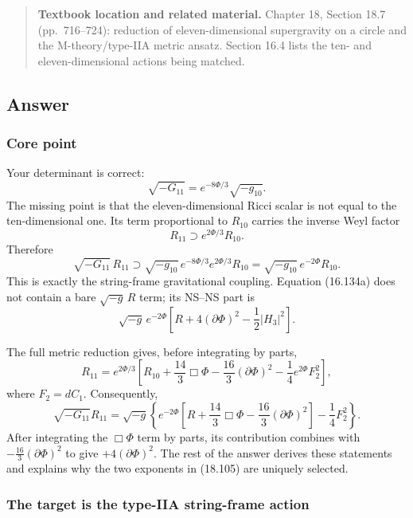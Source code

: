 \documentclass[
  10pt,
  a4paper,
  openany]{book}
\begin{document}
\begin{quote}
\textbf{Textbook location and related material.} Chapter 18, Section
18.7 (pp.~716--724): reduction of eleven-dimensional supergravity on a
circle and the M-theory/type-IIA metric ansatz. Section 16.4 lists the
ten- and eleven-dimensional actions being matched.
\end{quote}

\subsection{Answer}\label{answer-40}

\subsubsection{Core point}\label{core-point-40}

Your determinant is correct: \[
\boxed{
\sqrt{-G_{11}}
=e^{-8\Phi/3}\sqrt{-g_{10}}
}.
\] The missing point is that the eleven-dimensional Ricci scalar is not
equal to the ten-dimensional one. Its term proportional to \(R_{10}\)
carries the inverse Weyl factor \[
R_{11}
\supset
e^{2\Phi/3}R_{10}.
\] Therefore \[
\sqrt{-G_{11}}\,R_{11}
\supset
\sqrt{-g_{10}}\,
e^{-8\Phi/3}e^{2\Phi/3}R_{10}
=
\sqrt{-g_{10}}\,e^{-2\Phi}R_{10}.
\] This is exactly the string-frame gravitational coupling. Equation
(16.134a) does not contain a bare \(\sqrt{-g}\,R\) term; its NS--NS part
is \[
\boxed{
\sqrt{-g}\,e^{-2\Phi}
\left[
R+4(\partial\Phi)^2-\frac12|H_3|^2
\right]
}.
\]

The full metric reduction gives, before integrating by parts, \[
\boxed{
R_{11}
=e^{2\Phi/3}
\left[
R_{10}
+\frac{14}{3}\Box\Phi
-\frac{16}{3}(\partial\Phi)^2
-\frac14e^{2\Phi}F_2^2
\right]
},
\] where \(F_2=dC_1\). Consequently, \[
\boxed{
\sqrt{-G_{11}}R_{11}
=\sqrt{-g}
\left\{
e^{-2\Phi}
\left[
R+\frac{14}{3}\Box\Phi-\frac{16}{3}(\partial\Phi)^2
\right]
-\frac14F_2^2
\right\}.
}
\] After integrating the \(\Box\Phi\) term by parts, its contribution
combines with \(-\frac{16}{3}(\partial\Phi)^2\) to give
\(+4(\partial\Phi)^2\). The rest of the answer derives these statements
and explains why the two exponents in (18.105) are uniquely selected.

\subsubsection{The target is the type-IIA string-frame
action}\label{the-target-is-the-type-iia-string-frame-action}
\end{document}
